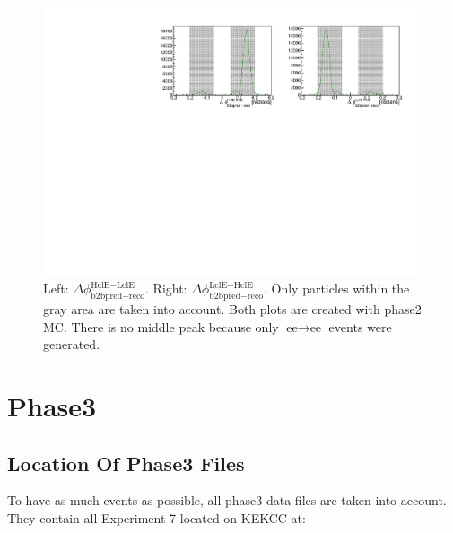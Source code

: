 \documentclass[a4paper,11pt,twosided,final,german,openbib,pdftex,listof=totoc,bibliography=totoc]{scrbook}
\begin{document}
\begin{appendix}
\begin{figure}[h!]
	\centering
	\includegraphics[width=\textwidth]{Plots/master/hb2b_MC.pdf}
	\caption[b2bClusterPhi - clusterPhi For Phase2 MC]{Left: $\Delta \phi _{\textrm{b2bpred} - \textrm{reco}}^{\textrm{HclE}-\textrm{LclE}}$. Right:  $\Delta \phi _{\textrm{b2bpred} - \textrm{reco}}^{\textrm{LclE}-\textrm{HclE}}$. Only particles within the gray area are taken into account. Both plots are created with phase2 MC. There is no middle peak because only $\textrm{ee} \rightarrow \textrm{ee}$ events were generated.}
	\label{fig:b2bMC2}
\end{figure}



















\clearpage
\section{Phase3}


\subsection{Location Of Phase3 Files}



To have as much events as possible, all phase3 data files are taken into account. They contain all Experiment 7 located on KEKCC at:
\newline


\end{appendix}
\end{document}

